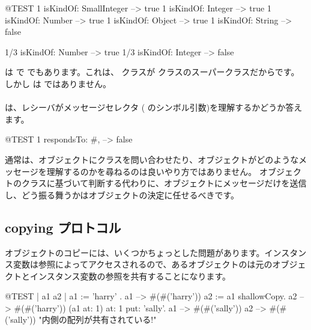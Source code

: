 \documentclass[a4paper,10pt,twoside]{book}
\begin{document}
\begin{code}{@TEST}
1 isKindOf: SmallInteger --> true
1 isKindOf: Integer          --> true
1 isKindOf: Number         --> true
1 isKindOf: Object           --> true
1 isKindOf: String            --> false

1/3 isKindOf: Number      --> true
1/3 isKindOf: Integer        --> false
\end{code}

 は  で  でもあります。これは、 クラスが  クラスのスーパークラスだからです。しかし  は  ではありません。

\paragraph{}
 は、レシーバがメッセージセレクタ ( のシンボル引数)を理解するかどうか答えます。

\begin{code}{@TEST}
1 respondsTo: #, --> false
\end{code}

通常は、オブジェクトにクラスを問い合わせたり、オブジェクトがどのようなメッセージを理解するのかを尋ねるのは良いやり方ではありません。
オブジェクトのクラスに基づいて判断する代わりに、オブジェクトにメッセージだけを送信し、どう振る舞うかはオブジェクトの決定に任せるべきです。%

\subsection{copying プロトコル}

オブジェクトのコピーには、いくつかちょっとした問題があります。インスタンス変数は参照によってアクセスされるので、あるオブジェクトのは元のオブジェクトとインスタンス変数の参照を共有することになります。%

\begin{code}{@TEST | a1 a2 |}
a1 := { { 'harry' } }.
a1 --> #(#('harry'))
a2 := a1 shallowCopy.
a2 --> #(#('harry'))
(a1 at: 1) at: 1 put: 'sally'.
a1 --> #(#('sally'))
a2 --> #(#('sally'))    "内側の配列が共有されている!"
\end{code}
\end{document}
